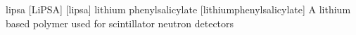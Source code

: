 \newglsXchemical%
{lipsa}%
[LiPSA]%
[lipsa]%
{lithium phenylsalicylate}%
{\ce{}}%
[lithiumphenylsalicylate]%
{A lithium based polymer used for scintillator neutron detectors}%
